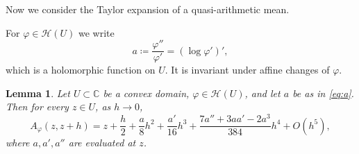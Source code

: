 \documentclass[a4paper, reqno, 11pt]{amsart}
\newtheorem{Lem}[Thm]{Lemma}
\theoremstyle{definition}
\begin{document}
Now we consider the Taylor expansion of a quasi-arithmetic mean. 

For $\varphi \in \mathcal{H}(U)$ we write
\begin{equation}\label{eq:a}
a \coloneqq  \frac{\varphi''}{\varphi'} = (\log \varphi')' ,
\end{equation}
which is a holomorphic function on $U$.
It is invariant under affine changes of $\varphi$.

\begin{Lem}\label{lem:expansion}
Let $U \subset \mathbb{C}$ be a convex domain, $\varphi \in \mathcal{H}(U)$, and let $a$ be as in \eqref{eq:a}.
Then for every $z \in U$, as $h \to 0$,
\begin{equation}\label{eq:expansion}
A_{\varphi}(z, z+h) = z + \frac{h}{2} + \frac{a}{8} h^2 + \frac{a'}{16} h^3 + \frac{7a'' + 3aa' - 2a^3}{384} h^4 + O(h^5),
\end{equation}
where $a, a', a''$ are evaluated at $z$.
\end{Lem}
\end{document}
